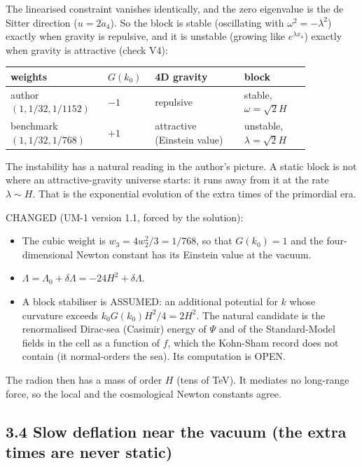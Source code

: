 \documentclass[11pt]{article}
\begin{document}
The linearised constraint vanishes identically, and the zero eigenvalue is the de Sitter direction ($u = 2\dot a_4$). So the block is stable (oscillating with $\omega^2 = -\lambda^2$) exactly when gravity is repulsive, and it is unstable (growing like $e^{\lambda x_4}$) exactly when gravity is attractive (check V4):

\begin{longtable}{>{\raggedright\arraybackslash}p{0.256\linewidth}>{\raggedright\arraybackslash}p{0.113\linewidth}>{\raggedright\arraybackslash}p{0.273\linewidth}>{\raggedright\arraybackslash}p{0.209\linewidth}}
\toprule
\textbf{weights} & \textbf{$G(k_0)$} & \textbf{4D gravity} & \textbf{block} \\
\midrule
author $(1, 1/32, 1/1152)$ & $-1$ & repulsive & stable, $\omega = \sqrt2H$ \\
benchmark $(1, 1/32, 1/768)$ & $+1$ & attractive (Einstein value) & unstable, $\lambda = \sqrt2H$ \\
\bottomrule
\end{longtable}

The instability has a natural reading in the author's picture. A static block is not where an attractive-gravity universe starts: it runs away from it at the rate $\lambda \sim H$. That is the exponential evolution of the extra times of the primordial era.

CHANGED (UM-1 version 1.1, forced by the solution):
\begin{itemize}
\item The cubic weight is $w_3 = 4w_2^2/3 = 1/768$, so that $G(k_0) = 1$ and the four-dimensional Newton constant has its Einstein value at the vacuum.
\item $\Lambda = \Lambda_0 + \delta\Lambda = -24H^2 + \delta\Lambda$.
\item A block stabiliser is ASSUMED: an additional potential for $k$ whose curvature exceeds $k_0G(k_0)H^2/4 = 2H^2$. The natural candidate is the renormalised Dirac-sea (Casimir) energy of $\Psi$ and of the Standard-Model fields in the cell as a function of $f$, which the Kohn-Sham record does not contain (it normal-orders the sea). Its computation is OPEN.
\end{itemize}

The radion then has a mass of order $H$ (tens of TeV). It mediates no long-range force, so the local and the cosmological Newton constants agree.

\subsection*{3.4 Slow deflation near the vacuum (the extra times are never static)}
\end{document}
